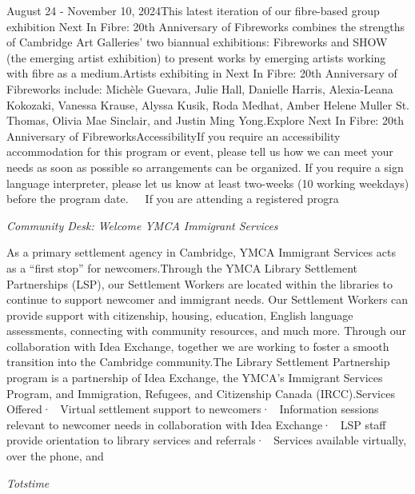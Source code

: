 \documentclass[letterpaper, 10pt]{article}
\newcommand{\subtitle}[1]{\textit{\large #1}\vspace{0.5em}}
\newcommand{\articlecontent}[1]{\small #1\vspace{1em}}
\begin{document}
\begin{multicols}{2}
{August 24 - November 10, 2024This latest iteration of our fibre-based group exhibition Next In Fibre: 20th Anniversary of Fibreworks combines the strengths of Cambridge Art Galleries’ two biannual exhibitions: Fibreworks and SHOW (the emerging artist exhibition) to present works by emerging artists working with fibre as a medium.Artists exhibiting in Next In Fibre: 20th Anniversary of Fibreworks include: Michèle Guevara, Julie Hall, Danielle Harris, Alexia-Leana Kokozaki, Vanessa Krause, Alyssa Kusik, Roda Medhat, Amber Helene Muller St. Thomas, Olivia Mae Sinclair, and Justin Ming Yong.Explore Next In Fibre: 20th Anniversary of FibreworksAccessibilityIf you require an accessibility accommodation for this program or event, please tell us how we can meet your needs as soon as possible so arrangements can be organized. If you require a sign language interpreter, please let us know at least two-weeks (10 working weekdays) before the program date.   If you are attending a registered progra
}
\vspace{10px}

\subtitle{Community Desk: Welcome YMCA Immigrant Services}

\articlecontent{

\qrcode[height=1.5cm]{https://ideaexchange.libnet.info/event/11502123}
\vspace{10px}

As a primary settlement agency in Cambridge, YMCA Immigrant Services acts as a “first stop” for newcomers.Through the YMCA Library Settlement Partnerships (LSP), our Settlement Workers are located within the libraries to continue to support newcomer and immigrant needs. Our Settlement Workers can provide support with citizenship, housing, education, English language assessments, connecting with community resources, and much more. Through our collaboration with Idea Exchange, together we are working to foster a smooth transition into the Cambridge community.The Library Settlement Partnership program is a partnership of Idea Exchange, the YMCA’s Immigrant Services Program, and Immigration, Refugees, and Citizenship Canada (IRCC).Services Offered·  Virtual settlement support to newcomers·  Information sessions relevant to newcomer needs in collaboration with Idea Exchange·  LSP staff provide orientation to library services and referrals·  Services available virtually, over the phone, and 
}
\vspace{10px}

\subtitle{Totstime}

\articlecontent{

}
\end{multicols}
\end{document}
